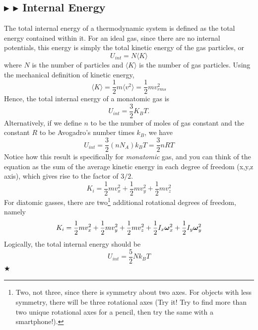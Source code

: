 \subsection{\color{RoyalBlue} $\blacktriangleright$ \color{Orchid} $\blacktriangleright$ \color{black} Internal Energy}\label{2.1.3}
The total internal energy of a thermodynamic system is defined as the total energy contained within it. For an ideal gas, since there are no internal potentials, this energy is simply the total kinetic energy of the gas particles, or
\begin{equation}
    U_{int} = N\langle K\rangle
\end{equation}
\noindent where $N$ is the number of particles and $\langle K\rangle$ is the number of gas particles. Using the mechanical definition of kinetic energy,
\begin{equation*}
    \langle K\rangle = \frac12 m\langle v^2\rangle = \frac12 mv_{rms}^2
\end{equation*}
\noindent Hence, the total internal energy of a monatomic gas is 
\begin{equation}
    {U_{int} = \frac32K_BT}.
\end{equation}
\noindent Alternatively, if we define $n$ to be the number of moles of gas constant and the constant $R$ to be Avogadro's number times $k_B$, we have
\begin{equation}
    U_{int} = \frac32 (nN_A)k_BT = \frac32 nRT
\end{equation}
\noindent Notice how this result is specifically for \textit{monatomic} gas, and you can think of the equation as the sum of the average kinetic energy in each degree of freedom (x,y,z axis), which gives rise to the factor of $3/2$. 
\begin{equation*}
    K_i = \frac12mv_x^2 + \frac12mv_y^2 + \frac12mv_z^2
\end{equation*}
\noindent For diatomic gasses, there are two\footnote{Two, not three, since there is symmetry about two axes. For objects with less symmetry, there will be three rotational axes (Try it! Try to find more than two unique rotational axes for a pencil, then try the same with a smartphone!).} additional rotational degrees of freedom, namely
\begin{equation*}
    K_i = \frac12mv_x^2 + \frac12mv_y^2 + \frac12mv_z^2 + \frac12I_x\boldsymbol{\omega}_x^2 + \frac12I_y\boldsymbol{\omega}_y^2
\end{equation*}
\noindent Logically, the total internal energy should be
\begin{equation}
    U_{int} = \frac52 Nk_BT
\end{equation}
$\bigstar$

